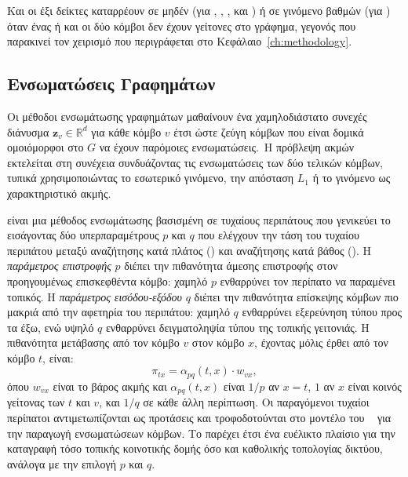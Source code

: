 Και οι έξι δείκτες καταρρέουν σε μηδέν (για , , ,  και ) ή σε γινόμενο
βαθμών (για ) όταν ένας ή και οι δύο κόμβοι δεν έχουν γείτονες στο γράφημα, γεγονός
που παρακινεί τον χειρισμό  που περιγράφεται στο
Κεφάλαιο~\ref{ch:methodology}.

\subsection{Ενσωματώσεις Γραφημάτων}
\label{subsec:graph-embeddings}

Οι μέθοδοι ενσωμάτωσης γραφημάτων μαθαίνουν ένα χαμηλοδιάστατο συνεχές διάνυσμα
$\mathbf{z}_v \in \mathbb{R}^d$ για κάθε κόμβο $v$ έτσι ώστε ζεύγη κόμβων που είναι
δομικά ομοιόμορφοι στο $G$ να έχουν παρόμοιες ενσωματώσεις.\ Η πρόβλεψη ακμών
εκτελείται στη συνέχεια συνδυάζοντας τις ενσωματώσεις των δύο τελικών κόμβων,
τυπικά χρησιμοποιώντας το εσωτερικό γινόμενο, την απόσταση $L_1$ ή το γινόμενο
 ως χαρακτηριστικό ακμής.

\textbf{} \cite{grover2016node2vec} είναι μια μέθοδος ενσωμάτωσης βασισμένη
σε τυχαίους περιπάτους που γενικεύει το ~\cite{perozzi2014deepwalk} εισάγοντας δύο υπερπαραμέτρους
$p$ και $q$ που ελέγχουν την τάση του τυχαίου περιπάτου μεταξύ αναζήτησης κατά
πλάτος () και αναζήτησης κατά βάθος (). Η \textit{παράμετρος επιστροφής} $p$
διέπει την πιθανότητα άμεσης επιστροφής στον προηγουμένως επισκεφθέντα κόμβο: χαμηλό
$p$ ενθαρρύνει τον περίπατο να παραμένει τοπικός.
Η \textit{παράμετρος εισόδου-εξόδου}
$q$ διέπει την πιθανότητα επίσκεψης κόμβων πιο μακριά από την αφετηρία του περιπάτου:
χαμηλό $q$ ενθαρρύνει εξερεύνηση τύπου  προς τα έξω, ενώ υψηλό $q$ ενθαρρύνει
δειγματοληψία τύπου  της τοπικής γειτονιάς.
Η πιθανότητα μετάβασης από τον κόμβο
$v$ στον κόμβο $x$, έχοντας μόλις έρθει από τον κόμβο $t$, είναι:
\begin{equation}
    \pi_{tx} = \alpha_{pq}(t, x) \cdot w_{vx},
    \label{eq:node2vec-transition}
\end{equation}
όπου $w_{vx}$ είναι το βάρος ακμής και $\alpha_{pq}(t, x)$ είναι $1/p$ αν $x = t$,
$1$ αν $x$ είναι κοινός γείτονας των $t$ και $v$, και $1/q$ σε κάθε άλλη περίπτωση.
Οι παραγόμενοι τυχαίοι περίπατοι αντιμετωπίζονται ως προτάσεις και τροφοδοτούνται
στο μοντέλο  του ~\cite{mikolov2013distributed} για την παραγωγή ενσωματώσεων κόμβων.
Το  παρέχει έτσι ένα ευέλικτο πλαίσιο για την καταγραφή τόσο τοπικής
κοινοτικής δομής όσο και καθολικής τοπολογίας δικτύου, ανάλογα με την επιλογή $p$
και $q$.

